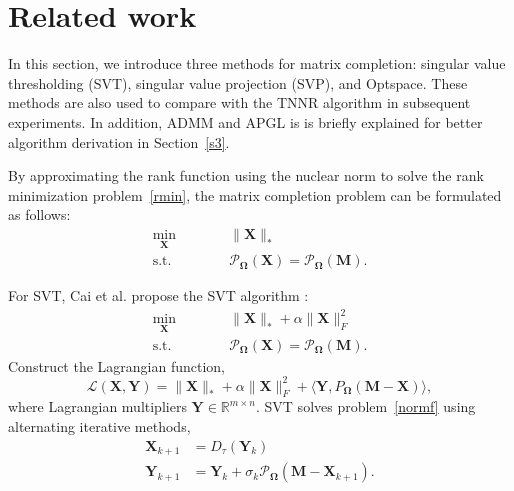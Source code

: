 \documentclass{article}
\begin{document}
{\section{Related work}
\label{s2}


In this section, we introduce three methods for matrix completion: singular value thresholding (SVT)\cite{cai.shen200810},  singular value projection (SVP)\cite{jain.dhillon2010}, and Optspace\cite{keshavan.montanari200906}. These methods are also used to compare with the TNNR algorithm in subsequent experiments. In addition, ADMM and APGL is is briefly explained for better algorithm derivation in Section~\ref{s3}.

By approximating the rank function using the nuclear norm to solve the rank
minimization problem~\eqref{rmin},  the matrix completion problem can be formulated\cite{fazel2002matrix} as follows:
\begin{equation}
    \begin{aligned}
        \min_{\mathbf X}\qquad&\quad \lVert\mathbf X\rVert_* \\
        \text{s.t.}\qquad&\quad  \mathcal{P}_{\mathbf \Omega}(\mathbf X) =  \mathcal{P}_{\mathbf\Omega}(\mathbf M).
    \end{aligned}
    \label{normf}
\end{equation}

For SVT, Cai et al. propose the SVT algorithm :
\begin{equation}
    \begin{aligned}
        \min_{\mathbf X}\qquad&\quad \lVert\mathbf X\rVert_* + \alpha\lVert \mathbf X\rVert_F^2\\
        \text{s.t.}\qquad&\quad\mathcal{P}_{\mathbf\Omega}(\mathbf X) =  \mathcal{P}_{\mathbf\Omega}(\mathbf M).
    \end{aligned}
\end{equation}
Construct the Lagrangian function,
\begin{equation}
    \mathcal{L}(\mathbf X,\mathbf Y) = \lVert\mathbf X\rVert_* + \alpha\lVert \mathbf X\rVert_F^2 + \langle \mathbf Y, P_{\mathbf\Omega}(\mathbf M-\mathbf X) \rangle,
\end{equation}
where Lagrangian multipliers $\mathbf Y \in \mathbb{R}^{m \times n}$. SVT solves problem~\eqref{normf} using alternating iterative methods,
\begin{equation}
    \begin{aligned}
        \mathbf X_{k+1} & = D_\tau(\mathbf Y_{k})\\
        \mathbf Y_{k+1}& = \mathbf Y_{k} + \sigma_k\mathcal{P}_{\mathbf\Omega}(\mathbf M-\mathbf X_{k+1}).
    \end{aligned}
\end{equation}

}
\end{document}
